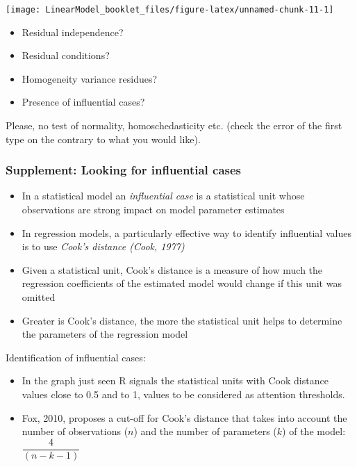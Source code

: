 \documentclass[
]{article}
\providecommand{\tightlist}{%
  \setlength{\itemsep}{0pt}\setlength{\parskip}{0pt}}
\begin{document}
\begin{center}\texttt{[image: LinearModel\_booklet\_files/figure-latex/unnamed-chunk-11-1]} \end{center}

\begin{itemize}
\tightlist
\item
  Residual independence?
\item
  Residual conditions?
\item
  Homogeneity variance residues?
\item
  Presence of influential cases?
\end{itemize}

Please, no test of normality, homoschedasticity etc. (check the error of
the first type on the contrary to what you would like).

\hypertarget{supplement-looking-for-influential-cases}{%
\subsubsection{Supplement: Looking for influential
cases}\label{supplement-looking-for-influential-cases}}

\begin{itemize}
\tightlist
\item
  In a statistical model an \emph{influential case} is a statistical
  unit whose observations are strong impact on model parameter estimates
\item
  In regression models, a particularly effective way to identify
  influential values is to use \emph{Cook's distance (Cook, 1977)}
\item
  Given a statistical unit, Cook's distance is a measure of how much the
  regression coefficients of the estimated model would change if this
  unit was omitted
\item
  Greater is Cook's distance, the more the statistical unit helps to
  determine the parameters of the regression model
\end{itemize}

Identification of influential cases:

\begin{itemize}
\tightlist
\item
  In the graph just seen R signals the statistical units with Cook
  distance values close to 0.5 and to 1, values to be considered as
  attention thresholds.
\item
  Fox, 2010, proposes a cut-off for Cook's distance that takes into
  account the number of observations (\(n\)) and the number of
  parameters (\(k\)) of the model: \(\dfrac{4}{(n-k-1)}\)
\end{itemize}
\end{document}
